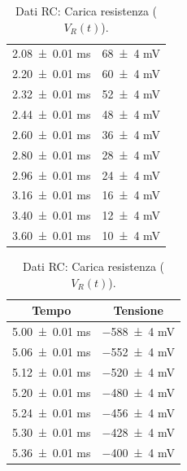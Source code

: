 \documentclass[a4paper]{article}
\begin{document}
\begin{appendices}
\begin{table}[htbp]
\begin{minipage}{0.48\textwidth}
\begin{tabular}{|c|c|}
        \num{2.08 \pm 0.01} \si{\milli\second} & \num{68 \pm 4} \si{\milli\volt} \\
        \num{2.20 \pm 0.01} \si{\milli\second} & \num{60 \pm 4} \si{\milli\volt} \\
        \num{2.32 \pm 0.01} \si{\milli\second} & \num{52 \pm 4} \si{\milli\volt} \\
        \num{2.44 \pm 0.01} \si{\milli\second} & \num{48 \pm 4} \si{\milli\volt} \\
        \num{2.60 \pm 0.01} \si{\milli\second} & \num{36 \pm 4} \si{\milli\volt} \\
        \num{2.80 \pm 0.01} \si{\milli\second} & \num{28 \pm 4} \si{\milli\volt} \\
        \num{2.96 \pm 0.01} \si{\milli\second} & \num{24 \pm 4} \si{\milli\volt} \\
        \num{3.16 \pm 0.01} \si{\milli\second} & \num{16 \pm 4} \si{\milli\volt} \\
        \num{3.40 \pm 0.01} \si{\milli\second} & \num{12 \pm 4} \si{\milli\volt} \\
        \num{3.60 \pm 0.01} \si{\milli\second} & \num{10 \pm 4} \si{\milli\volt} \\
        \hline
        \end{tabular}
        \caption{Dati RC: Carica resistenza ($V_R(t)$).}
        \label{tab:rc_data_carica_r}
    \end{minipage}\hfill %
    \begin{minipage}{0.48\textwidth}
        \centering\small %
        \begin{tabular}{|c|c|}
        \hline
        Tempo & Tensione \\\hline\hline
        \num{5.00 \pm 0.01} \si{\milli\second} & \num{-588 \pm 4} \si{\milli\volt} \\
        \num{5.06 \pm 0.01} \si{\milli\second} & \num{-552 \pm 4} \si{\milli\volt} \\
        \num{5.12 \pm 0.01} \si{\milli\second} & \num{-520 \pm 4} \si{\milli\volt} \\
        \num{5.20 \pm 0.01} \si{\milli\second} & \num{-480 \pm 4} \si{\milli\volt} \\
        \num{5.24 \pm 0.01} \si{\milli\second} & \num{-456 \pm 4} \si{\milli\volt} \\
        \num{5.30 \pm 0.01} \si{\milli\second} & \num{-428 \pm 4} \si{\milli\volt} \\
        \num{5.36 \pm 0.01} \si{\milli\second} & \num{-400 \pm 4} \si{\milli\volt} \\

\end{tabular}
\end{minipage}
\end{table}
\end{appendices}
\end{document}
